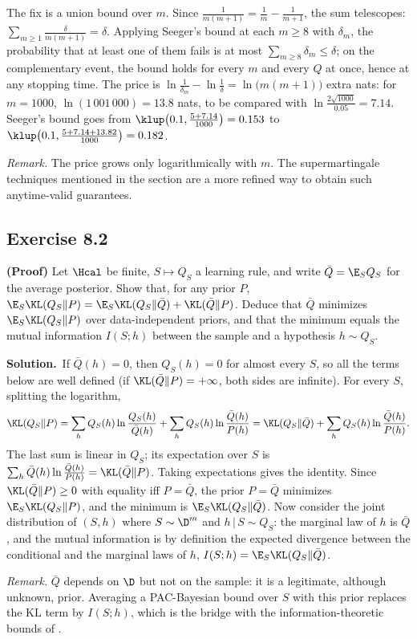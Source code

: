 \documentclass[11pt]{article}
\newcommand{\statement}[1]{\begin{tcolorbox}[enhanced,breakable,colback=black!3,colframe=black!25,boxrule=0.4pt,sharp corners,fontupper=\itshape\small]#1\end{tcolorbox}}
\newcommand{\exo}[1]{\Needspace{6\baselineskip}\subsection*{Exercise #1}\addcontentsline{toc}{subsection}{Exercise #1}}
\newcommand{\sol}{\noindent\textbf{Solution.}\ }
\begin{document}
The fix is a union bound over $m$. Since $\frac1{m(m+1)}=\frac1m-\frac1{m+1}$, the sum telescopes: $\sum_{m\geq1}\frac{\delta}{m(m+1)}=\delta$. Applying
Seeger's bound at each $m\geq8$ with $\delta_m$, the probability that at least one of them fails is at most
$\sum_{m\geq8}\delta_m\leq\delta$; on the complementary event, the bound holds for every $m$ and every $Q$ at once, hence at any
stopping time. The price is $\ln\frac1{\delta_m}-\ln\frac1\delta=\ln\big(m(m+1)\big)$ extra nats: for $m=1000$, $\ln(1\,001\,000)=13.8$ nats, to
be compared with $\ln\frac{2\sqrt{1000}}{0.05}=7.14$. Seeger's bound goes from $\klup\big(0.1,\frac{5+7.14}{1000}\big)=0.153$ to
$\klup\big(0.1,\frac{5+7.14+13.82}{1000}\big)=0.182$.

\emph{Remark.} The price grows only logarithmically with $m$. The supermartingale techniques mentioned in the section are a more
refined way to obtain such anytime-valid guarantees.

\exo{8.2}
\statement{\textbf{(Proof)} Let $\Hcal$ be finite, $S\mapsto Q_S$ a learning rule, and write $\bar Q=\E_S Q_S$ for the average posterior. Show
that, for any prior $P$, $\E_S\KL(Q_S\|P)=\E_S\KL(Q_S\|\bar Q)+\KL(\bar Q\|P)$. Deduce that $\bar Q$ minimizes $\E_S\KL(Q_S\|P)$ over
data-independent priors, and that the minimum equals the mutual information $I(S;h)$ between the sample and a hypothesis
$h\sim Q_S$.}

\sol If $\bar Q(h)=0$, then $Q_S(h)=0$ for almost every $S$, so all the terms below are well defined (if $\KL(\bar Q\|P)=+\infty$, both sides
are infinite). For every $S$, splitting the logarithm,
\[
\KL(Q_S\|P)=\sum_hQ_S(h)\ln\frac{Q_S(h)}{\bar Q(h)}+\sum_hQ_S(h)\ln\frac{\bar Q(h)}{P(h)}=\KL(Q_S\|\bar Q)+\sum_hQ_S(h)\ln\frac{\bar Q(h)}{P(h)}.
\]
The last sum is linear in $Q_S$; its expectation over $S$ is $\sum_h\bar Q(h)\ln\frac{\bar Q(h)}{P(h)}=\KL(\bar Q\|P)$. Taking expectations gives the
identity. Since $\KL(\bar Q\|P)\geq0$ with equality iff $P=\bar Q$, the prior $P=\bar Q$ minimizes $\E_S\KL(Q_S\|P)$, and the minimum is
$\E_S\KL(Q_S\|\bar Q)$. Now consider the joint distribution of $(S,h)$ where $S\sim\D^m$ and $h\,|\,S\sim Q_S$: the marginal law of $h$ is
$\bar Q$, and the mutual information is by definition the expected divergence between the conditional and the marginal
laws of $h$, $I(S;h)=\E_S\KL(Q_S\|\bar Q)$.

\emph{Remark.} $\bar Q$ depends on $\D$ but not on the sample: it is a legitimate, although unknown, prior. Averaging a
PAC-Bayesian bound over $S$ with this prior replaces the KL term by $I(S;h)$, which is the bridge with the
information-theoretic bounds of \citet{xu2017information}.
\end{document}
